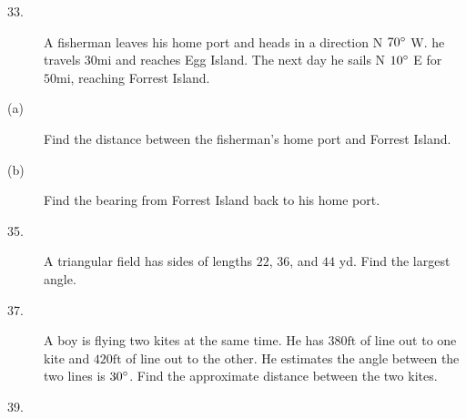 \begin{description}
\item [33.]
A fisherman leaves his home port and heads in a direction N $70 \mbox{{\ensuremath{{}^\circ}}}$ W. he travels $30 \mbox{mi}$ and reaches Egg Island. The next day he sails N
$10 \mbox{{\ensuremath{{}^\circ}}}$ E for $50 \mbox{mi}$, reaching Forrest Island. 

\item [(a)]
Find the distance between the fisherman's home port and Forrest Island. 

\item [(b)]
Find the bearing from Forrest Island back to his home port. 

\item [35.]
A triangular field has sides of lengths $22$, $36$, and $44$ yd. Find the largest angle. 

\item [37.]
A boy is flying two kites at the same time. He has $380 \mbox{ft}$ of line out to one kite and $420 \mbox{ft}$ of line out to the other. He estimates the angle
between the two lines is $30 \mbox{{\ensuremath{{}^\circ}}}$. Find the approximate distance between the two
kites. 

\item [39.]   
\columnsep =30pt
 \end{description}


